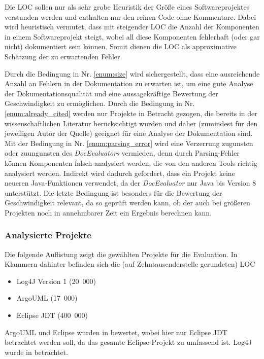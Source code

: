 Die \ac{LOC} sollen nur als sehr grobe Heuristik der Größe eines Softwareprojektes verstanden werden und enthalten nur den reinen Code ohne Kommentare. Dabei wird heuristisch vermutet, dass mit steigender \ac{LOC} die Anzahl der Komponenten in einem Softwareprojekt steigt, wobei all diese Komponenten fehlerhaft (oder gar nicht) dokumentiert sein können. Somit dienen die \ac{LOC} als approximative Schätzung der zu erwartenden Fehler. 

 Durch die Bedingung in Nr. \ref{enum:size} wird sichergestellt, dass eine ausreichende Anzahl an Fehlern in der Dokumentation zu erwarten ist, um eine gute Analyse der Dokumentationsqualität  und eine aussagekräftige Bewertung der Geschwindigkeit zu ermöglichen. Durch die Bedingung in Nr.  \ref{enum:already_cited} werden nur Projekte in Betracht gezogen, die bereits in der wissenschaftlichen Literatur berücksichtigt wurden und daher (zumindest für den jeweiligen Autor der Quelle) geeignet für eine Analyse der Dokumentation sind. Mit der Bedingung in Nr. \ref{enum:parsing_error} wird eine Verzerrung zugunsten oder zuungunsten des \textit{DocEvaluators} vermieden, denn durch Parsing-Fehler können Komponenten falsch analysiert werden, die von den anderen Tools richtig analysiert werden. Indirekt wird dadurch gefordert, dass ein Projekt keine neueren Java-Funktionen verwendet, da  der \textit{DocEvaluator} nur Java bis Version 8 unterstützt. Die letzte Bedingung ist besonders für die Bewertung der Geschwindigkeit relevant, da so geprüft werden kann, ob der \doceval auch bei größeren Projekten noch in annehmbarer Zeit ein Ergebnis berechnen kann. 
 
 \subsubsection{Analysierte Projekte}\label{chapter:eval_projects}
 Die folgende Auflistung zeigt die gewählten Projekte für die Evaluation. In Klammern dahinter befinden sich die  (auf Zehntausenderstelle gerundeten) \ac{LOC}
 \begin{itemize}
  \item Log4J Version 1 (20~000)
    \item ArgoUML (17~000)
     \item Eclipse \ac{JDT} (400~000)
 \end{itemize}
 
 ArgoUML und Eclipse wurden in \cite[S.~74] {AutomaticQualityAssessmentofSourceCodeComments:TheJavadocMiner} bewertet, wobei hier nur Eclipse \ac{JDT} betrachtet werden soll, da das gesamte Eclipse-Projekt zu umfassend ist. Log4J wurde in \cite[S.~267] {@tComment:TestingJavadocCommentstoDetectComment-CodeInconsistencies} betrachtet. 

